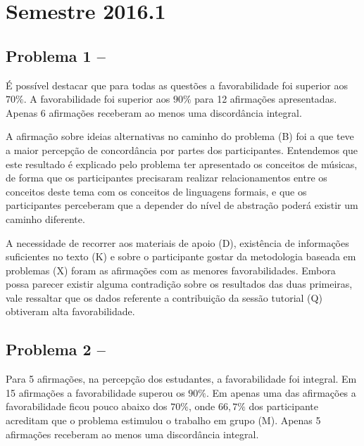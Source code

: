 \section{Semestre 2016.1}
\label{sec-sem-2016}
\subsection{Problema 1 -- \ProblemaA}

É possível destacar que para todas as questões a favorabilidade
foi superior aos $70\%$. A favorabilidade foi superior aos $90\%$
para 12 afirmações apresentadas.
Apenas 6 afirmações receberam ao menos uma discordância integral.

A afirmação sobre ideias alternativas no caminho do problema (B)
foi a que teve a maior percepção de concordância por partes dos
participantes.
Entendemos que este resultado é explicado pelo problema
ter apresentado os conceitos de músicas, de forma que
os participantes precisaram realizar relacionamentos entre
os conceitos deste tema com os conceitos de linguagens
formais, e que os participantes perceberam que a depender do
nível de abstração poderá existir um caminho diferente.


A necessidade de recorrer aos materiais de apoio (D),
existência de informações suficientes no texto (K) e
sobre o participante gostar da metodologia baseada
em problemas (X) foram as afirmações com
as menores favorabilidades.
Embora possa parecer existir alguma contradição
sobre os resultados das duas primeiras, vale
ressaltar que os dados referente
a contribuição da sessão tutorial (Q) obtiveram
alta favorabilidade.


\subsection{Problema 2 -- \ProblemaB}

Para 5 afirmações, na percepção dos estudantes, a favorabilidade foi integral.
Em 15 afirmações a favorabilidade superou os $90\%$.
Em apenas uma das afirmações a favorabilidade ficou pouco abaixo dos $70\%$, onde
$66,7\%$ dos participante acreditam que o problema estimulou
o trabalho em grupo (M).
Apenas 5 afirmações receberam ao menos uma discordância integral.

